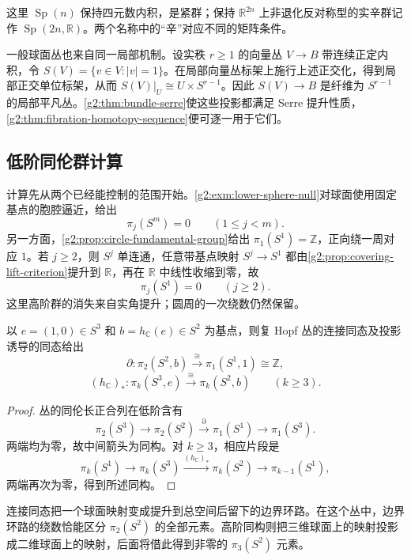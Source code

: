 这里 \(\operatorname{Sp}(n)\) 保持四元数内积，是紧群；保持 \(\mathbb R^{2n}\) 上非退化反对称型的实辛群记作 \(\operatorname{Sp}(2n,\mathbb R)\)。两个名称中的“辛”对应不同的矩阵条件。

\ProseParagraphBreak

一般球面丛也来自同一局部机制。设实秩 \(r\ge1\) 的向量丛 \(V\rightarrow B\) 带连续正定内积，令 \(S(V)=\{v\in V:|v|=1\}\)。在局部向量丛标架上施行上述正交化，得到局部正交单位标架，从而 \(S(V)|_U\cong U\times S^{r-1}\)。因此 \(S(V)\rightarrow B\) 是纤维为 \(S^{r-1}\) 的局部平凡丛。\cref{g2:thm:bundle-serre}使这些投影都满足 Serre 提升性质，\cref{g2:thm:fibration-homotopy-sequence}便可逐一用于它们。

\subsection{低阶同伦群计算}
\label{g2:subsec:0804:03}

计算先从两个已经能控制的范围开始。\cref{g2:exm:lower-sphere-null}对球面使用固定基点的胞腔逼近，给出
\[
	\pi_j(S^m)=0\qquad(1\le j<m).
\]
另一方面，\cref{g2:prop:circle-fundamental-group}给出 \(\pi_1(S^1)=\mathbb Z\)，正向绕一周对应 \(1\)。若 \(j\ge2\)，则 \(S^j\) 单连通，任意带基点映射 \(S^j\rightarrow S^1\) 都由\cref{g2:prop:covering-lift-criterion}提升到 \(\mathbb R\)，再在 \(\mathbb R\) 中线性收缩到零，故
\[
	\pi_j(S^1)=0\qquad(j\ge2).
\]
这里高阶群的消失来自实角提升；圆周的一次绕数仍然保留。

\begin{proposition}\label{g2:prop:complex-hopf-homotopy}
	以 \(e=(1,0)\in S^3\) 和 \(b=h_{\mathbb C}(e)\in S^2\) 为基点，则复 Hopf 丛的连接同态及投影诱导的同态给出
	\[
		\partial:\pi_2(S^2,b)\xrightarrow{\cong}\pi_1(S^1,1)\cong\mathbb Z,
	\]
	\[
		(h_{\mathbb C})_*:\pi_k(S^3,e)\xrightarrow{\cong}\pi_k(S^2,b)\qquad(k\ge3).
	\]
\end{proposition}
\begin{proof}
	丛的同伦长正合列在低阶含有
	\[
		\pi_2(S^3)\longrightarrow\pi_2(S^2)\xrightarrow{\partial}\pi_1(S^1)\longrightarrow\pi_1(S^3).
	\]
	两端均为零，故中间箭头为同构。对 \(k\ge3\)，相应片段是
	\[
		\pi_k(S^1)\longrightarrow\pi_k(S^3)\xrightarrow{(h_{\mathbb C})_*}\pi_k(S^2)\longrightarrow\pi_{k-1}(S^1),
	\]
	两端再次为零，得到所述同构。
\end{proof}

连接同态把一个球面映射变成提升到总空间后留下的边界环路。在这个丛中，边界环路的绕数恰能区分 \(\pi_2(S^2)\) 的全部元素。高阶同构则把三维球面上的映射投影成二维球面上的映射，后面将借此得到非零的 \(\pi_3(S^2)\) 元素。

